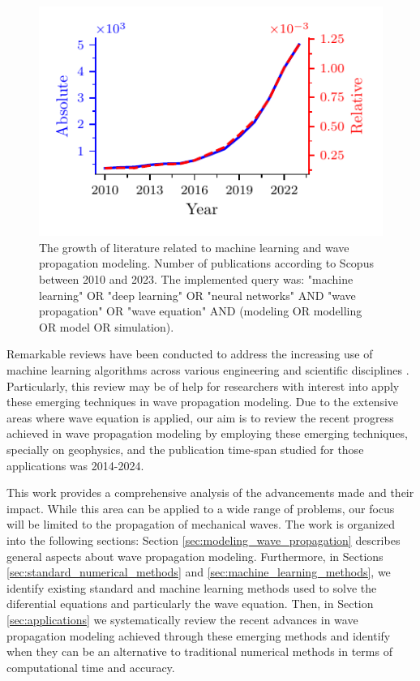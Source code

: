 \documentclass[11pt,twoside]{article}
\begin{document}
\begin{figure}[H]
\centering
    \includegraphics[scale=1]{figs/publications_absolute_relative.pdf}
    \caption{The growth of literature related to machine learning and wave propagation modeling. Number of publications according 
    to Scopus between 2010 and 2023. The implemented query was: "machine learning" OR "deep learning" OR "neural networks" AND 
    "wave propagation" OR "wave equation" AND (modeling OR modelling OR model OR simulation).}
    \label{dl-wave_propagation-publications}
\end{figure}

Remarkable reviews have been conducted to address the increasing use of machine learning algorithms across various engineering and scientific 
disciplines \citep{vadyala_review_2022,deng_physics-informed_2023,lino_current_2023}. Particularly, this review may be of help for 
researchers with interest into apply these emerging techniques in wave propagation modeling. Due to the extensive areas where wave equation 
is applied, our aim is to review the recent progress achieved in wave propagation modeling by employing these emerging techniques, 
specially on geophysics, and the publication time-span studied for those applications was 2014-2024.

This work provides a comprehensive analysis of the advancements made and their impact. While this area can be applied to a wide range of 
problems, our focus will be limited to the propagation of mechanical waves. The work is organized into the following sections: 
Section \ref{sec:modeling_wave_propagation} describes general aspects about wave propagation modeling. Furthermore, in 
Sections \ref{sec:standard_numerical_methods} and \ref{sec:machine_learning_methods}, we identify existing standard and machine 
learning methods used to solve the diferential equations and particularly the wave equation. Then, in Section 
\ref{sec:applications} we systematically review the recent advances in wave propagation modeling achieved through these 
emerging methods and identify when they can be an alternative to traditional numerical methods in terms of computational 
time and accuracy. 
\end{document}
